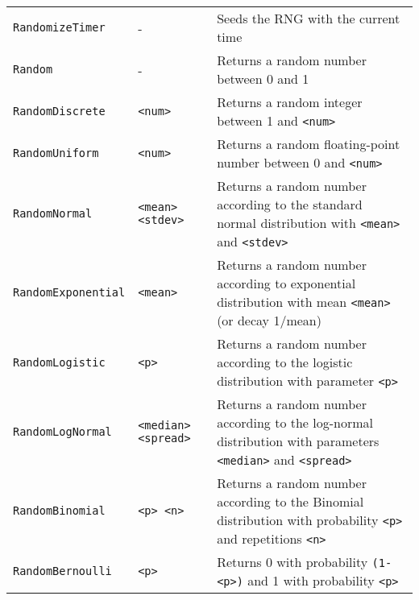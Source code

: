 \begin{longtable}{p{3cm}p{3cm}p{6cm}}
\verb+RandomizeTimer+ & - & Seeds the RNG with the current time\\ 
\verb+Random+ & - & Returns a random number between 0 and 1\\ 
\verb+RandomDiscrete+ &\verb+<num>+ &Returns a random integer between 1 and \verb+<num>+ \\ 
\verb+RandomUniform+ &\verb+<num>+ &Returns a random floating-point number between 0 and \verb+<num>+ \\ 
\verb+RandomNormal+ &\verb+<mean> <stdev>+ &Returns a random number according to the standard normal distribution with \verb+<mean>+ and \verb+<stdev>+\\ 
\verb+RandomExponential+ &\verb+<mean>+ &Returns a random number according to exponential distribution with mean \verb+<mean>+ (or decay 1/mean)\\ 
\verb+RandomLogistic+ &\verb+<p>+ &Returns a random number according to the logistic distribution with parameter \verb+<p>+\\ 
\verb+RandomLogNormal+ &\verb+<median> <spread>+ &Returns a random number according to the log-normal distribution with parameters \verb+<median>+ and \verb+<spread>+\\ 
\verb+RandomBinomial+ &\verb+<p> <n>+&Returns a random number according to the Binomial distribution with probability \verb+<p>+ and repetitions \verb+<n>+\\ 
\verb+RandomBernoulli+ &\verb+<p>+ &Returns 0 with probability \verb+(1-<p>)+ and 1 with probability \verb+<p>+\\ 


\end{longtable}

